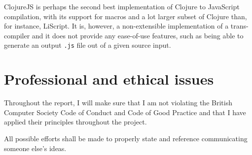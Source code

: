 ClojureJS is perhaps the second best implementation of Clojure to JavaScript compilation, with its support for macros and a lot larger subset of Clojure than, for instance, LiScript. 
It is, however, a non-extensible implementation of a trans-compiler and it does not provide any ease-of-use features, such as being able to generate an output \texttt{.js} file out of a given source input. 

\section{Professional and ethical issues}
Throughout the report, I will make sure that I am not violating the British Computer Society Code of Conduct and Code of Good Practice and that I have applied their principles throughout the project.

All possible efforts shall be made to properly state and reference communicating someone else's ideas.
